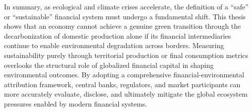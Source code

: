 In summary, as ecological and climate crises accelerate, the definition of a “safe” or “sustainable” financial system must undergo a fundamental shift. This thesis shows that an economy cannot achieve a genuine green transition through the decarbonization of domestic production alone if its financial intermediaries continue to enable environmental degradation across borders. Measuring sustainability purely through territorial production or final consumption metrics overlooks the structural role of globalized financial capital in shaping environmental outcomes. By adopting a comprehensive financial-environmental attribution framework, central banks, regulators, and market participants can more accurately evaluate, disclose, and ultimately mitigate the global ecosystem pressures enabled by modern financial systems.
